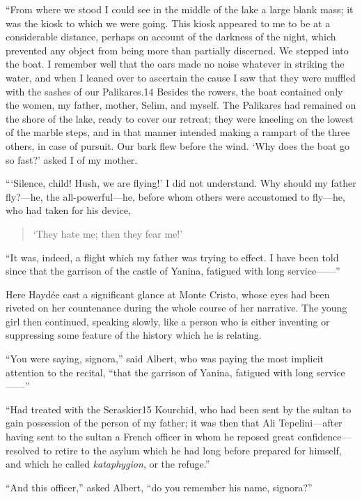 “From where we stood I could see in the middle of the lake a large
blank mass; it was the kiosk to which we were going. This kiosk
appeared to me to be at a considerable distance, perhaps on account of
the darkness of the night, which prevented any object from being more
than partially discerned. We stepped into the boat. I remember well
that the oars made no noise whatever in striking the water, and when I
leaned over to ascertain the cause I saw that they were muffled with
the sashes of our Palikares.14 Besides the rowers, the boat contained
only the women, my father, mother, Selim, and myself. The Palikares had
remained on the shore of the lake, ready to cover our retreat; they
were kneeling on the lowest of the marble steps, and in that manner
intended making a rampart of the three others, in case of pursuit. Our
bark flew before the wind. ‘Why does the boat go so fast?’ asked I of
my mother.

“‘Silence, child! Hush, we are flying!’ I did not understand. Why
should my father fly?—he, the all-powerful—he, before whom others were
accustomed to fly—he, who had taken for his device,

\begin{quote}
{\small‘They hate me; then they fear me!’}
\end{quote}

“It was, indeed, a flight which my father was trying to effect. I have
been told since that the garrison of the castle of Yanina, fatigued
with long service——”

Here Haydée cast a significant glance at Monte Cristo, whose eyes had
been riveted on her countenance during the whole course of her
narrative. The young girl then continued, speaking slowly, like a
person who is either inventing or suppressing some feature of the
history which he is relating.

“You were saying, signora,” said Albert, who was paying the most
implicit attention to the recital, “that the garrison of Yanina,
fatigued with long service——”

“Had treated with the Seraskier15 Kourchid, who had been sent by the
sultan to gain possession of the person of my father; it was then that
Ali Tepelini—after having sent to the sultan a French officer in whom
he reposed great confidence—resolved to retire to the asylum which he
had long before prepared for himself, and which he called
\textit{kataphygion}, or the refuge.”

“And this officer,” asked Albert, “do you remember his name, signora?”

